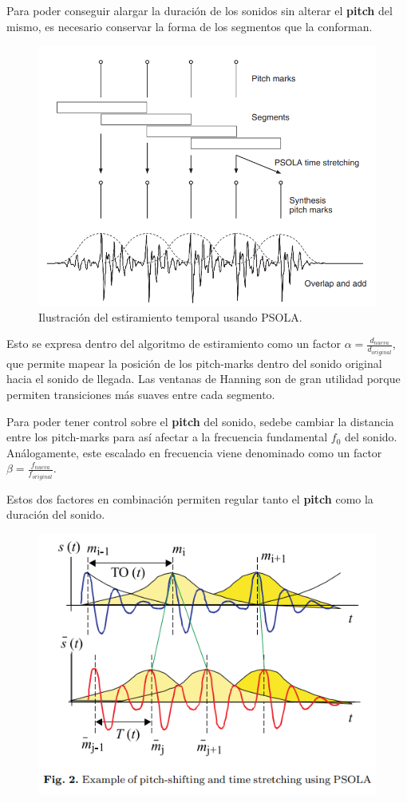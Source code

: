 Para poder conseguir alargar la duración de los sonidos sin alterar el \textbf{pitch} del mismo, es necesario conservar la forma de los segmentos que la conforman.

\begin{figure}[H]
	\centering
	\includegraphics[width=0.7\linewidth]{ImagenesEjercicio5/TimeStretchingPSOLA.PNG}
	\caption{Ilustración del estiramiento temporal usando PSOLA.}
	\label{fig:TSPSOLA}
\end{figure}

Esto se expresa dentro del algoritmo de estiramiento como un factor $\alpha = \frac{d_{nueva}}{d_{original}}$, que permite mapear la posición de los pitch-marks dentro del sonido original hacia el sonido de llegada. Las ventanas de Hanning son de gran utilidad porque permiten transiciones más suaves entre cada segmento.

Para poder tener control sobre el \textbf{pitch} del sonido, sedebe cambiar la distancia entre los pitch-marks para así afectar a la frecuencia fundamental $f_0$ del sonido. Análogamente, este escalado en frecuencia viene denominado como un factor $\beta = \frac{f_{nueva}}{f_{original}}$.

Estos dos factores en combinación permiten regular tanto el \textbf{pitch} como la duración del sonido.
\begin{figure}[H]
	\centering
	\includegraphics[width=0.7\linewidth]{ImagenesEjercicio5/PTS}
	\caption{}
	\label{fig:pts}
\end{figure}

